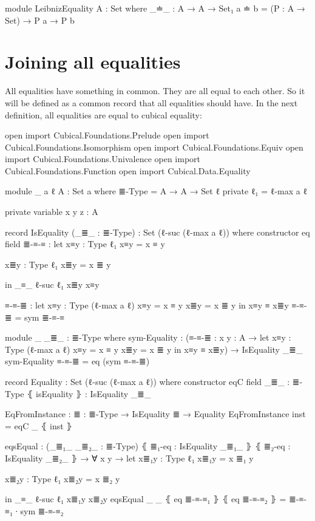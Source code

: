 \documentclass{article}
\begin{document}
\begin{code}
module LeibnizEquality {A : Set} where
  _≐_ : A → A → Set₁
  a ≐ b = (P : A → Set) → P a → P b
\end{code}

\section{Joining all equalities}

All equalities have something in common. They are all equal to each other.
So it will be defined as a common record that all equalities should have.
In the next definition, all equalities are equal to cubical equality:

\begin{code}

open import Cubical.Foundations.Prelude
open import Cubical.Foundations.Isomorphism
open import Cubical.Foundations.Equiv
open import Cubical.Foundations.Univalence
open import Cubical.Foundations.Function
open import Cubical.Data.Equality

module _ {a ℓ} {A : Set a} where
  ≣-Type = A → A → Set ℓ
  private
    ℓ₁ = ℓ-max a ℓ

  private variable
    x y z : A

  record IsEquality (_≣_ : ≣-Type) : Set (ℓ-suc (ℓ-max a ℓ)) where
    constructor eq
    field
      ≣-≡-≡ : let
        x≡y : Type ℓ₁
        x≡y = x ≡ y

        x≣y : Type ℓ₁
        x≣y = x ≣ y

        in _≡_ {ℓ-suc ℓ₁} x≣y x≡y

    ≡-≡-≣ : let
      x≡y : Type (ℓ-max a ℓ)
      x≡y = x ≡ y
      x≣y = x ≣ y
      in x≡y ≡ x≣y
    ≡-≡-≣ = sym ≣-≡-≡

  module _ {_≣_ : ≣-Type} where
    sym-Equality : (≡-≡-≣ : {x y : A} → let
      x≡y : Type (ℓ-max a ℓ)
      x≡y = x ≡ y
      x≣y = x ≣ y
      in x≡y ≡ x≣y)
      → IsEquality _≣_
    sym-Equality ≡-≡-≣ = eq (sym ≡-≡-≣)

  record Equality : Set (ℓ-suc (ℓ-max a ℓ)) where
    constructor eqC
    field
      _≣_ : ≣-Type
      ⦃ isEquality ⦄ : IsEquality _≣_

  EqFromInstance : {≣ : ≣-Type} → IsEquality ≣ → Equality
  EqFromInstance inst = eqC _ ⦃ inst ⦄

  eqsEqual : (_≣₁_ _≣₂_ : ≣-Type)
    ⦃ ≣₁-eq : IsEquality _≣₁_ ⦄
    ⦃ ≣₂-eq : IsEquality _≣₂_ ⦄
    → ∀ {x y} → let
      x≣₁y : Type ℓ₁
      x≣₁y = x ≣₁ y

      x≣₂y : Type ℓ₁
      x≣₂y = x ≣₂ y

      in _≡_ {ℓ-suc ℓ₁} x≣₁y x≣₂y
  eqsEqual _ _ ⦃ eq ≣-≡-≡₁ ⦄ ⦃ eq ≣-≡-≡₂ ⦄ = ≣-≡-≡₁ ∙ sym ≣-≡-≡₂
\end{code}
\end{document}
